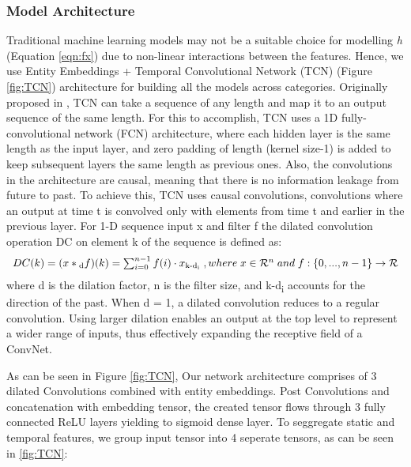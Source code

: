 \subsubsection{Model Architecture}
Traditional machine learning models may not be a suitable choice for modelling \emph{h} (Equation \ref{eqn:fx}) due to 
non-linear interactions between the features. Hence, we use Entity Embeddings + Temporal Convolutional Network (TCN) 
(Figure \ref{fig:TCN}) architecture for building all the models 
across categories. Originally proposed in \cite{lea2016temporal}, TCN can take a sequence of any length and map it to an 
output sequence of the same length. For this to accomplish, TCN uses a 1D fully-convolutional network (FCN) architecture, 
where each hidden layer is the same length as the input layer, and zero padding of length (kernel size-1) is added to 
keep subsequent layers the same length as previous ones. Also, the convolutions in the architecture are causal, 
meaning that there is no information leakage from future to past. To achieve this, TCN uses causal convolutions, 
convolutions where an output at time t is convolved only with elements from time t and earlier in the previous layer.
For 1-D sequence input x and filter f the dilated convolution operation DC on element k of the sequence is defined as:
  \begin{equation}
      \begin{array}{l}
        DC(k) = (x\ast \textsubscript{d}f)(k) =  \sum_{i=0}^{n-1}f(i)\cdot x\textsubscript{k-d\textsubscript{i}}
        \;, where \;
        x \in \mathcal{R}^n \;and\;
        f : \{0, . . . , n-1\} \to \mathcal{R}
      \end{array}
    \label{eqn:logloss}
  \end{equation}
where d is the dilation factor, n is the filter size, and k-d\textsubscript{i}
accounts for the direction of the past. When d = 1, a dilated convolution reduces to a
regular convolution. Using larger dilation enables an output
at the top level to represent a wider range of inputs, thus
effectively expanding the receptive field of a ConvNet.

As can be seen in Figure \ref{fig:TCN}, Our network architecture comprises of 3 dilated Convolutions combined with 
entity embeddings. Post Convolutions and concatenation with embedding tensor, the created tensor flows through 
3 fully connected ReLU layers yielding to sigmoid dense layer. To seggregate static and temporal
features, we group input tensor into 4 seperate tensors, as can be seen in \ref{fig:TCN}:

